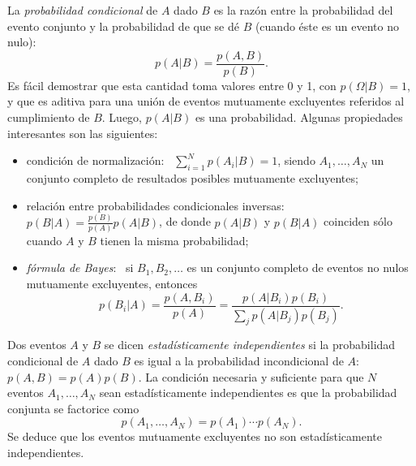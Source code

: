 La  {\it probabilidad condicional}  de  $A$ dado  $B$  es la  raz\'on entre  la
probabilidad del  evento conjunto y la  probabilidad de que se  d\'e $B$ (cuando
\'este es un evento no nulo):
%
$$
p(A|B)=\frac{p(A,B)}{p(B)} .
$$ 
%
Es f\'acil demostrar %
que  esta cantidad  toma valores  entre 0  y 1,  con $p(\Omega|B)=1$,  y  que es
aditiva  para  una  uni\'on  de  eventos  mutuamente  excluyentes  referidos  al
cumplimiento de  $B$. Luego, $p(A|B)$  es una probabilidad.  Algunas propiedades
interesantes son las siguientes:
%
\begin{itemize}
\item  condici\'on  de  normalizaci\'on:  \  $\sum_{i=1}^N  p(A_i|B)=1$,  siendo
  $A_1,\ldots,A_N$  un  conjunto  completo  de  resultados  posibles  mutuamente
  excluyentes;
%
\item    relaci\'on    entre    probabilidades   condicionales    inversas:    \
  $p(B|A)=\frac{p(B)}{p(A)}  p(A|B)$,  de donde  $p(A|B)$  y $p(B|A)$  coinciden
  s\'olo cuando $A$ y $B$ tienen la misma probabilidad;
%
\item {\it f\'ormula de Bayes}: \ si $B_1, B_2, \ldots$ es un conjunto completo
  de eventos no nulos mutuamente excluyentes, entonces
  $$
  p(B_i|A)=\frac{p(A,B_i)}{p(A)}   =   \frac{p(A|B_i)  p(B_i)}{\sum_j   p(A|B_j)
    p(B_j)} .
  $$ 
\end{itemize}

Dos eventos  $A$ y $B$  se dicen {\it estad\'isticamente independientes}  si la
probabilidad  condicional   de  $A$  dado   $B$  es  igual  a   la  probabilidad
incondicional  de  $A$:  \   $p(A,B)=p(A)  p(B)$.  La  condici\'on  necesaria  y
suficiente  para  que   $N$  eventos  $A_1,\ldots,A_N$  sean  estad\'isticamente
independientes es que la probabilidad conjunta se factorice como
%
$$
p(A_1,\ldots,A_N)=p(A_1) \cdots p(A_N) .
$$
%
Se  deduce que  los  eventos mutuamente  excluyentes  no son  estad\'isticamente
independientes.

\cite{ManWol95}